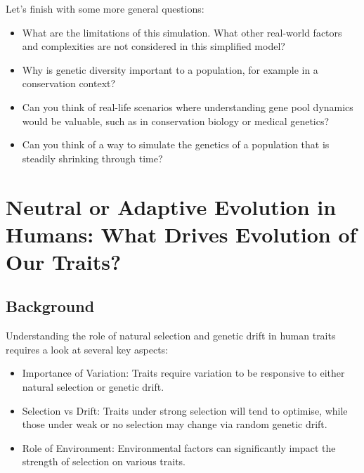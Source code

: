 \documentclass[
  a4paper]{book}
\providecommand{\tightlist}{%
  \setlength{\itemsep}{0pt}\setlength{\parskip}{0pt}}
\begin{document}
Let's finish with some more general questions:

\begin{itemize}
\tightlist
\item
  What are the limitations of this simulation. What other real-world factors and complexities are not considered in this simplified model?
\end{itemize}

\begin{itemize}
\tightlist
\item
  Why is genetic diversity important to a population, for example in a conservation context?
\end{itemize}

\begin{itemize}
\item
  Can you think of real-life scenarios where understanding gene pool dynamics would be valuable, such as in conservation biology or medical genetics?
\item
  Can you think of a way to simulate the genetics of a population that is steadily shrinking through time?
\end{itemize}

\hypertarget{neutral-or-adaptive-evolution-in-humans-what-drives-evolution-of-our-traits}{%
\chapter{Neutral or Adaptive Evolution in Humans: What Drives Evolution of Our Traits?}\label{neutral-or-adaptive-evolution-in-humans-what-drives-evolution-of-our-traits}}

\hypertarget{background-11}{%
\section{Background}\label{background-11}}

Understanding the role of natural selection and genetic drift in human traits requires a look at several key aspects:

\begin{itemize}
\tightlist
\item
  Importance of Variation: Traits require variation to be responsive to either natural selection or genetic drift.
\item
  Selection vs Drift: Traits under strong selection will tend to optimise, while those under weak or no selection may change via random genetic drift.
\item
  Role of Environment: Environmental factors can significantly impact the strength of selection on various traits.
\end{itemize}
\end{document}
